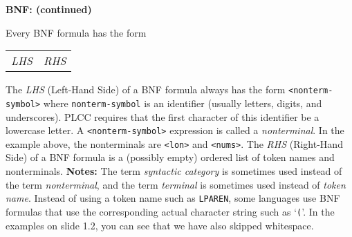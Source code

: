 \begin{minipage}[t]{\sw}
\slidenumber
\LARGE
{\bf BNF: (continued)}\exx
\emm{\Large\LightBox{\MYlon}}\exx

Every BNF formula has the form

\vspace{1ex}
\emm%
\begin{tabular}{@{}l@{\tt ~::=~}l}
{\em LHS} & {\em RHS} \\
\end{tabular}

\vspace{1ex}
The {\em LHS} (Left-Hand Side) of a BNF formula always has the form
\verb'<nonterm-symbol>' where \verb'nonterm-symbol' is an identifier
(usually letters, digits, and underscores).
PLCC requires that the first character
of this identifier be a lowercase letter.
A \verb'<nonterm-symbol>' expression is called a {\em nonterminal}.
In the example above,
the nonterminals are \verb'<lon>' and \verb'<nums>'.\exx
The {\em RHS} (Right-Hand Side) of a BNF formula
is a (possibly empty) ordered list
of token names and nonterminals.\exx
{\bf Notes:} The term {\em syntactic category} is sometimes used instead
of the term {\em nonterminal},
and the term {\em terminal} is sometimes used instead of {\em token name}.
Instead of using a token name such as \verb'LPAREN',
some languages use BNF formulas that use
the corresponding actual character string such as `\verb'(''.
In the examples on slide 1.2,
you can see that we have also skipped whitespace.
\end{minipage}
\clearpage
